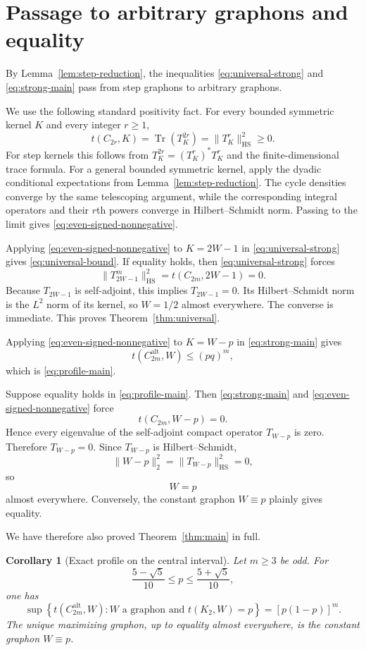 \documentclass[11pt]{article}
\newtheorem{corollary}[theorem]{Corollary}
\newcommand{\Tr}{\operatorname{Tr}}
\newcommand{\HS}{\mathrm{HS}}
\newcommand{\Alt}{\mathrm{alt}}
\begin{document}
\section{Passage to arbitrary graphons and equality}\label{sec:limit}

By Lemma~\ref{lem:step-reduction}, the inequalities \eqref{eq:universal-strong} and
\eqref{eq:strong-main} pass from step graphons to arbitrary graphons.

We use the following standard positivity fact.  For every bounded symmetric kernel $K$ and every
integer $r\ge1$,
\begin{equation}
   t(C_{2r},K)=\Tr(T_K^{2r})=\|T_K^r\|_{\HS}^2\ge0.
   \label{eq:even-signed-nonnegative}
\end{equation}
For step kernels this follows from
$T_K^{2r}=(T_K^r)^*T_K^r$ and the finite-dimensional trace formula.  For a general bounded
symmetric kernel, apply the dyadic conditional expectations from Lemma~\ref{lem:step-reduction}.
The cycle densities converge by the same telescoping argument, while the corresponding integral
operators and their $r$th powers converge in Hilbert--Schmidt norm.  Passing to the limit gives
\eqref{eq:even-signed-nonnegative}.

Applying \eqref{eq:even-signed-nonnegative} to $K=2W-1$ in
\eqref{eq:universal-strong} gives \eqref{eq:universal-bound}.  If equality holds, then
\eqref{eq:universal-strong} forces
\[
   \|T_{2W-1}^m\|_{\HS}^2=t(C_{2m},2W-1)=0.
\]
Because $T_{2W-1}$ is self-adjoint, this implies $T_{2W-1}=0$.  Its Hilbert--Schmidt norm is the
$L^2$ norm of its kernel, so $W=1/2$ almost everywhere.  The converse is immediate.  This proves
Theorem~\ref{thm:universal}.

Applying \eqref{eq:even-signed-nonnegative} to $K=W-p$ in \eqref{eq:strong-main} gives
\[
   t(C_{2m}^{\Alt},W)\le(pq)^m,
\]
which is \eqref{eq:profile-main}.

Suppose equality holds in \eqref{eq:profile-main}.  Then \eqref{eq:strong-main} and \eqref{eq:even-signed-nonnegative} force
\[
   t(C_{2m},W-p)=0.
\]
Hence every eigenvalue of the self-adjoint compact operator $T_{W-p}$ is zero.  Therefore $T_{W-p}=0$.  Since $T_{W-p}$ is Hilbert--Schmidt,
\[
   \|W-p\|_2^2=\|T_{W-p}\|_{\HS}^2=0,
\]
so
\[
   W=p
\]
almost everywhere.  Conversely, the constant graphon $W\equiv p$ plainly gives equality.

We have therefore also proved Theorem~\ref{thm:main} in full.

\begin{corollary}[Exact profile on the central interval]
Let $m\ge3$ be odd.  For
\[
   \frac{5-\sqrt5}{10}\le p\le\frac{5+\sqrt5}{10},
\]
one has
\[
   \sup\left\{
      t(C_{2m}^{\Alt},W):
      W\text{ a graphon and }t(K_2,W)=p
   \right\}
   =[p(1-p)]^m.
\]
The unique maximizing graphon, up to equality almost everywhere, is the constant graphon $W\equiv p$.
\end{corollary}
\end{document}
